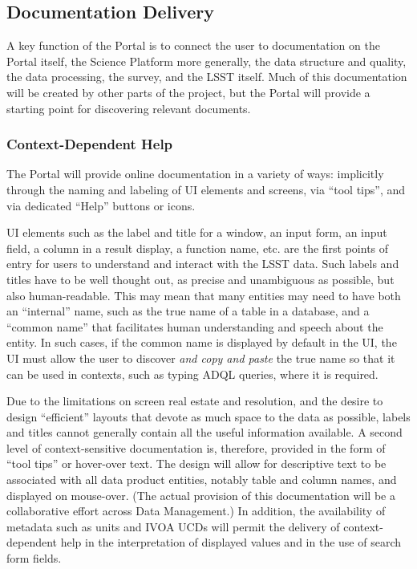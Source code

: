 \subsection{Documentation Delivery}\label{documentation-delivery}

A key function of the Portal is to connect the user to documentation on the Portal itself, the Science Platform more generally, the data structure and quality, the data processing, the survey, and the LSST itself.
Much of this documentation will be created by other parts of the project, but the Portal will provide a starting point for discovering relevant documents.

\subsubsection{Context-Dependent Help}\label{context-dependent-help}

The Portal will provide online documentation in a variety of ways: implicitly through the naming and labeling of UI elements and screens, via ``tool tips'', and via dedicated ``Help'' buttons or icons.

UI elements such as the label and title for a window, an input form, an input field, a column in a result display, a function name, etc. are the first points of entry for users to understand and interact with the LSST data. 
Such labels and titles have to be well thought out, as precise and unambiguous as possible, but also human-readable.
This may mean that many entities may need to have both an ``internal'' name, such as the true name of a table in a database, and a ``common name'' that facilitates human understanding and speech about the entity.
In such cases, if the common name is displayed by default in the UI, the UI must allow the user to discover \emph{and copy and paste} the true name so that it can be used in contexts, such as typing ADQL queries, where it is required.

Due to the limitations on screen real estate and resolution, and the desire to design ``efficient'' layouts that devote as much space to the data as possible, labels and titles cannot generally contain all the useful information available.
A second level of context-sensitive documentation is, therefore, provided in the form of ``tool tips'' or hover-over text.
The design will allow for descriptive text to be associated with all data product entities, notably table and column names, and displayed on mouse-over.
(The actual provision of this documentation will be a collaborative effort across Data Management.)
In addition, the availability of metadata such as units and IVOA UCDs will permit the delivery of context-dependent help in the interpretation of displayed values and in the use of search form fields.

